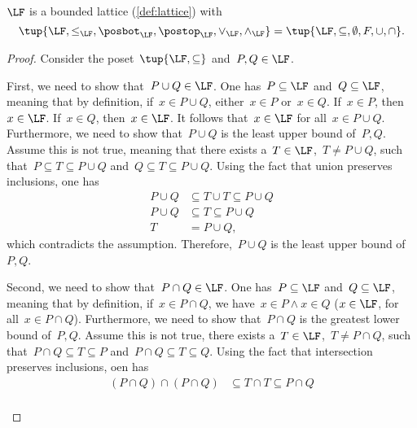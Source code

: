 \begin{lemma}
  $\LF$ is a bounded lattice (\cref{def:lattice}) with
  \begin{equation}
    \tup{\LF,\leq_{\LF},\posbot_{\LF},\postop_{\LF},\vee_{\LF},\wedge_{\LF}}=\tup{\LF,\subseteq,\emptyset,F,\cup,\cap}.
  \end{equation}
\end{lemma}
\begin{proof}
  Consider the poset~$\tup{\LF,\subseteq}$ and~$P,Q\in \LF$.
  \begin{compactitem}
    \item First, we need to show that~$P\cup Q\in \LF$. One has~$P \subseteq \LF$ and~$Q\subseteq \LF$, meaning that by definition, if~$x\in P\cup Q$, either~$x\in P$ or~$x\in Q$. If~$x\in P$, then~$x\in \LF$. If~$x\in Q$, then~$x\in \LF$. It follows that~$x\in \LF$ for all~$x\in P\cup Q$. Furthermore, we need to show that~$P\cup Q$ is the least upper bound of~$P,Q$. Assume this is not true, meaning that  there exists a~$T\in \LF$,~$T\neq P\cup Q$, such that~$P\subseteq T\subseteq P\cup Q$ and~$Q\subseteq T\subseteq P\cup Q$. Using the fact that union preserves inclusions, one has
    \begin{equation}
      \begin{aligned}
        P\cup Q &\subseteq T\cup T \subseteq P\cup Q\\
        P\cup Q &\subseteq T \subseteq P\cup Q\\
        T&= P\cup Q,
      \end{aligned}
    \end{equation}
    which contradicts the assumption. Therefore,~$P\cup Q$ is the least upper bound of~$P,Q$.
    \item Second, we need to show that~$P\cap Q\in \LF$. One has~$P\subseteq \LF$ and~$Q\subseteq \LF$, meaning that by definition, if~$x\in P\cap Q$, we have~$x\in P\wedge x\in Q$ ($x\in \LF$, for all~$x\in P\cap Q$). Furthermore, we need to show that~$P\cap Q$ is the greatest lower bound of~$P,Q$. Assume this is not true, \ie  there exists a~$T\in \LF$,~$T\neq P\cap Q$, such that~$P\cap Q\subseteq T\subseteq P$ and~$P\cap Q\subseteq T\subseteq Q$. Using the fact that intersection preserves inclusions, oen has
    \begin{equation}
      \begin{aligned}
      (P\cap Q)
        \cap (P\cap Q) &\subseteq T \cap T \subseteq P\cap Q\\

\end{aligned}
\end{equation}
\end{compactitem}
\end{proof}
